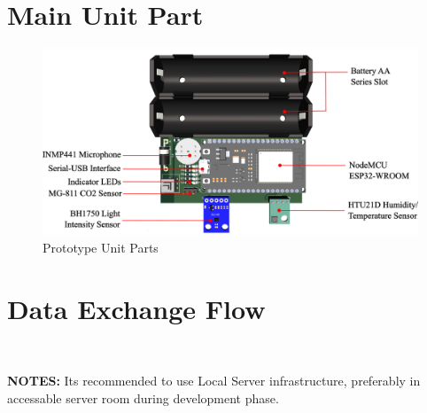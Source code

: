 \documentclass[a4paper,12pt,oneside,pdflatex,italian,final,twocolumn]{article}
\begin{document}
	\raggedright
	\section{Main Unit Part}
	
	\centering
	\begin{figure}[!ht]
		\centering
		\includegraphics[width=\textwidth,]{images/node_part.png}
		\caption{Prototype Unit Parts}
	\end{figure}

	\raggedright
	\section{Data Exchange Flow}
	
	\\
	
	\vspace{10pt}
	
	\textbf{NOTES:} Its recommended to use Local Server infrastructure, preferably in accessable server room during development phase.
\end{document}
